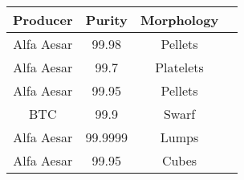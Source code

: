 \begin{tabular}{cccc}
\toprule
  Producer &   Purity & Morphology \\
\midrule
Alfa Aesar &    99.98 &    Pellets \\
Alfa Aesar &     99.7 &  Platelets \\
Alfa Aesar &    99.95 &    Pellets \\
       BTC &     99.9 &      Swarf \\
Alfa Aesar &  99.9999 &      Lumps \\
Alfa Aesar &    99.95 &      Cubes \\
\bottomrule
\end{tabular}
